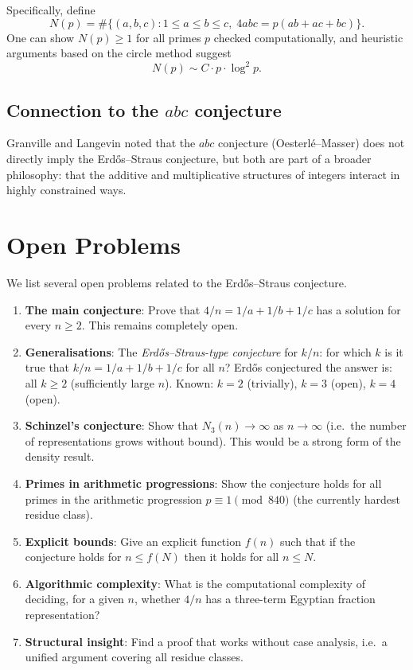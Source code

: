 \documentclass[12pt,a4paper]{amsart}
\theoremstyle{definition}
\begin{document}
Specifically, define
\[
  N(p) = \#\{(a,b,c) : 1 \leq a \leq b \leq c,\; 4abc = p(ab+ac+bc)\}.
\]
One can show $N(p) \geq 1$ for all primes $p$ checked computationally,
and heuristic arguments based on the circle method suggest
\[
  N(p) \sim C \cdot p \cdot \log^2 p.
\]

\subsection{Connection to the $abc$ conjecture}

Granville and Langevin noted that the $abc$ conjecture (Oesterl\'e--Masser)
does not directly imply the Erd\H{o}s--Straus conjecture, but both are part
of a broader philosophy: that the additive and multiplicative structures
of integers interact in highly constrained ways.

\section{Open Problems}

We list several open problems related to the Erd\H{o}s--Straus conjecture.

\begin{enumerate}
\item \textbf{The main conjecture}: Prove that $4/n = 1/a + 1/b + 1/c$
      has a solution for every $n \geq 2$.  This remains completely open.

\item \textbf{Generalisations}: The \emph{Erd\H{o}s--Straus-type conjecture}
      for $k/n$: for which $k$ is it true that $k/n = 1/a + 1/b + 1/c$
      for all $n$?  Erd\H{o}s conjectured the answer is: all $k \geq 2$
      (sufficiently large $n$).  Known: $k = 2$ (trivially), $k = 3$ (open), $k = 4$ (open).

\item \textbf{Schinzel's conjecture}: Show that $N_3(n) \to \infty$ as
      $n \to \infty$ (i.e.\ the number of representations grows
      without bound).  This would be a strong form of the density result.

\item \textbf{Primes in arithmetic progressions}: Show the conjecture
      holds for all primes in the arithmetic progression $p \equiv 1 \pmod{840}$
      (the currently hardest residue class).

\item \textbf{Explicit bounds}: Give an explicit function $f(n)$ such that
      if the conjecture holds for $n \leq f(N)$ then it holds for all
      $n \leq N$.

\item \textbf{Algorithmic complexity}: What is the computational complexity
      of deciding, for a given $n$, whether $4/n$ has a three-term
      Egyptian fraction representation?

\item \textbf{Structural insight}: Find a proof that works without
      case analysis, i.e.\ a unified argument covering all residue classes.
\end{enumerate}
\end{document}
